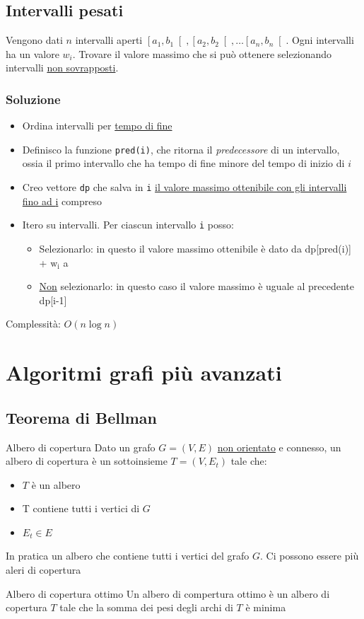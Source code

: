 \subsection{Intervalli pesati}\label{intervalli pesati}
Vengono dati $ n $ intervalli aperti $ \left[a_1, b_1\right[, \left[a_2, b_2\right[ , \ldots  \left[a_n, b_n\right[ $. Ogni intervalli ha un valore $ w_i $. Trovare il valore massimo che si può ottenere selezionando intervalli \underline{non sovrapposti}.

\subsubsection{Soluzione}
\begin{itemize}
	\item Ordina intervalli per \underline{tempo di fine}
	\item Definisco la funzione \verb|pred(i)|, che ritorna il \textit{predecessore} di un intervallo, ossia il primo intervallo che ha tempo di fine minore del tempo di inizio di $ i $
	\item Creo vettore \verb|dp| che salva in \verb|i| \underline{il valore massimo ottenibile con gli intervalli fino ad {\ttfamily i}} compreso
	\item Itero su intervalli. Per ciascun intervallo \verb|i| posso:
	      \begin{itemize}
		      \item Selezionarlo: in questo il valore massimo ottenibile è dato da {\ttfamily dp[pred(i)] + $ \text{w}_{\text{i}} $} a
		      \item \underline{Non} selezionarlo: in questo caso il valore massimo è uguale al precedente {\ttfamily dp[i-1]}
	      \end{itemize}
\end{itemize}
Complessità: $ O\left(n \log n\right) $
\section{Algoritmi grafi più avanzati}
\subsection{Teorema di Bellman}
\begin{definizione}{Albero di copertura}
	Dato un grafo $ G = \left(V, E\right) $ \underline{non orientato} e connesso, un albero di copertura è un sottoinsieme $ T = \left(V, E_t\right) $ tale che:
	\begin{itemize}
		\item $ T $ è un albero
		\item T contiene tutti i vertici di $ G $
		\item $ E_t \in E $
	\end{itemize}
\end{definizione}
In pratica un albero che contiene tutti i vertici del grafo $ G $. Ci possono essere più aleri di copertura
\begin{definizione}{Albero di copertura ottimo}
	Un albero di compertura ottimo è un albero di copertura $ T $ tale che la somma dei pesi degli archi di $ T $ è minima
\end{definizione}



